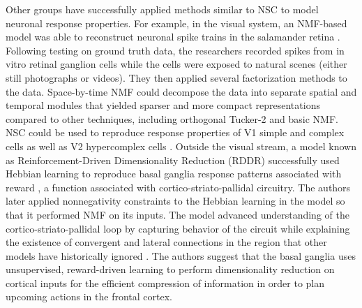 Other groups have successfully applied methods similar to NSC to model neuronal response properties. For example, in the visual system, an NMF-based model was able to reconstruct neuronal spike trains in the salamander retina \citep{Onken2016}. Following testing on ground truth data, the researchers recorded spikes from in vitro retinal ganglion cells  while the cells were exposed to natural scenes (either still photographs or videos). They then applied several factorization methods to the data. Space-by-time NMF could decompose the data into separate spatial and temporal modules that yielded sparser and more compact representations compared to other techniques, including orthogonal Tucker-2 and basic NMF. \ac{NSC} could be used to reproduce response properties of \ac{V1} simple and complex cells \citep{HoyerHyvarinen2002,Hoyer2003} as well as V2 hypercomplex cells \citep{Hyvarinen2005}. Outside the visual stream, a model known as Reinforcement-Driven Dimensionality Reduction (RDDR) successfully used Hebbian learning to reproduce basal ganglia response patterns associated with reward \citep{BarGad2000}, a function associated with cortico-striato-pallidal circuitry. The authors later applied nonnegativity constraints to the Hebbian learning in the model so that it performed \ac{NMF} on its inputs. The model advanced understanding of the cortico-striato-pallidal loop by capturing behavior of the circuit while explaining the existence of convergent and lateral connections in the region that other models have historically ignored \citep{BarGad2003_Review}. The authors suggest that the basal ganglia uses unsupervised, reward-driven learning to perform dimensionality reduction on cortical inputs for the efficient compression of information in order to plan upcoming actions in the frontal cortex.







